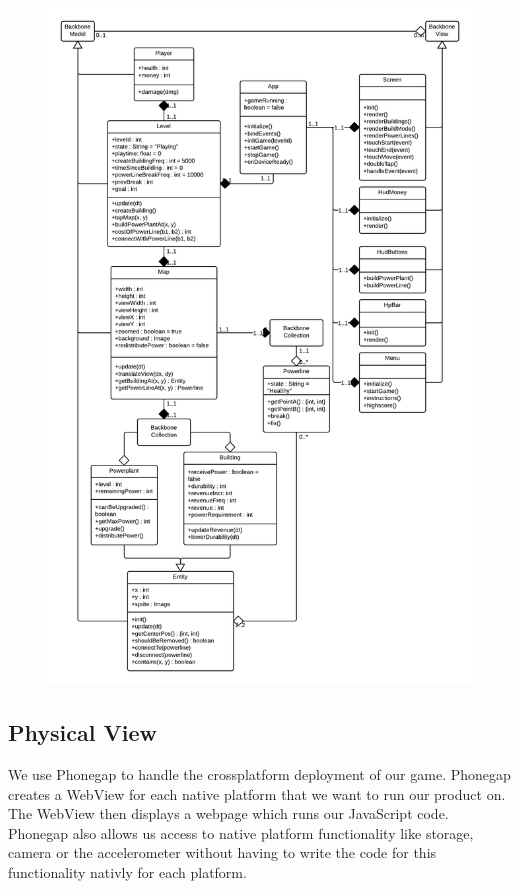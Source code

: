 	\begin{figure}[H]
	\centering
	\includegraphics[width=\textwidth, height=\textheight, keepaspectratio]{pictures/class_diagram}
	\end{figure}

\subsection*{Physical View}

	We use Phonegap to handle the crossplatform deployment of our game. Phonegap creates a WebView for
	each native platform that we want to run our product on. The WebView then displays a webpage which
	runs our JavaScript code. Phonegap also allows us access to native platform functionality like
	storage, camera or the accelerometer without having to write the code for this functionality nativly
	for each platform.


